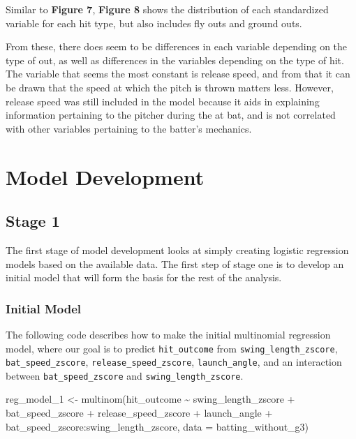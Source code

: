 \documentclass[
  letterpaper,
  DIV=11,
  numbers=noendperiod]{scrartcl}
\newenvironment{Shaded}{\begin{snugshade}}{\end{snugshade}}
\newcommand{\AttributeTok}[1]{\textcolor[rgb]{0.40,0.45,0.13}{#1}}
\newcommand{\FunctionTok}[1]{\textcolor[rgb]{0.28,0.35,0.67}{#1}}
\newcommand{\NormalTok}[1]{\textcolor[rgb]{0.00,0.23,0.31}{#1}}
\newcommand{\OtherTok}[1]{\textcolor[rgb]{0.00,0.23,0.31}{#1}}
\newcommand{\SpecialCharTok}[1]{\textcolor[rgb]{0.37,0.37,0.37}{#1}}
\begin{document}
Similar to \textbf{Figure 7}, \textbf{Figure 8} shows the distribution
of each standardized variable for each hit type, but also includes fly
outs and ground outs.

From these, there does seem to be differences in each variable depending
on the type of out, as well as differences in the variables depending on
the type of hit. The variable that seems the most constant is release
speed, and from that it can be drawn that the speed at which the pitch
is thrown matters less. However, release speed was still included in the
model because it aids in explaining information pertaining to the
pitcher during the at bat, and is not correlated with other variables
pertaining to the batter's mechanics.

\section{Model Development}\label{model-development}

\subsection{Stage 1}\label{stage-1}

The first stage of model development looks at simply creating logistic
regression models based on the available data. The first step of stage
one is to develop an initial model that will form the basis for the rest
of the analysis.

\subsubsection{Initial Model}\label{initial-model}

The following code describes how to make the initial multinomial
regression model, where our goal is to predict \texttt{hit\_outcome}
from \texttt{swing\_length\_zscore}, \texttt{bat\_speed\_zscore},
\texttt{release\_speed\_zscore}, \texttt{launch\_angle}, and an
interaction between \texttt{bat\_speed\_zscore} and
\texttt{swing\_length\_zscore}.

\begin{Shaded}
\begin{Highlighting}[]
\NormalTok{reg\_model\_1 }\OtherTok{\textless{}{-}} \FunctionTok{multinom}\NormalTok{(hit\_outcome }\SpecialCharTok{\textasciitilde{}} 
\NormalTok{                     swing\_length\_zscore }\SpecialCharTok{+}
\NormalTok{                     bat\_speed\_zscore }\SpecialCharTok{+}
\NormalTok{                     release\_speed\_zscore }\SpecialCharTok{+}
\NormalTok{                     launch\_angle }\SpecialCharTok{+}
\NormalTok{                     bat\_speed\_zscore}\SpecialCharTok{:}\NormalTok{swing\_length\_zscore,}
                   \AttributeTok{data =}\NormalTok{ batting\_without\_g3) }
\end{Highlighting}
\end{Shaded}
\end{document}

